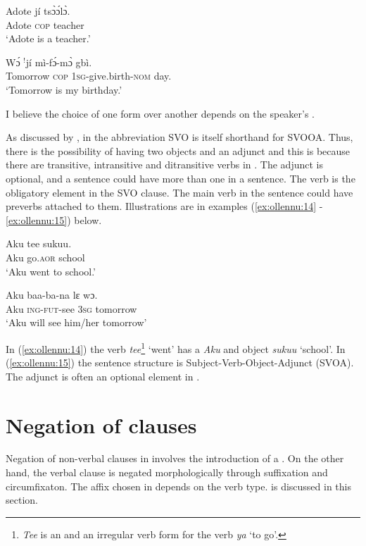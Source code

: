 \documentclass[output=paper,newtxmath,modfonts,nonflat,draftmode]{langsci/langscibook}
\begin{document}
\ea \label{ex:ollennu:12}
\gll Adote jí ts\`ɔ\'ɔl\`ɔ.\\
Adote \textsc{cop} teacher\\
\glt`Adote is a teacher.'
\z

\ea \label{ex:ollennu:13}
\gll W\'ɔ $^{!}$jí mì-f\'ɔ-m\`ɔ gbì.\\
Tomorrow \textsc{cop} 1\textsc{sg}-give.birth-\textsc{nom} day.\\
\glt `Tomorrow is my birthday.'
\z


I believe the choice of one form over another depends on the speaker’s .

As discussed by \citet{Dakubu2003}, in  the abbreviation SVO is itself shorthand for SVOOA. Thus, there is the possibility of having two objects and an adjunct and this is because there are transitive, intransitive and ditransitive verbs in . The adjunct is optional, and a sentence could have more than one in a sentence. The verb is the obligatory element in the SVO clause. The main verb in the sentence could have preverbs attached to them. Illustrations are in examples (\ref{ex:ollennu:14} -\ref{ex:ollennu:15}) below.

\ea \label{ex:ollennu:14}
\gll Aku tee sukuu.\\
Aku go.\textsc{aor} school\\
\glt `Aku went to school.'
\z

\ea \label{ex:ollennu:15}
 \gll Aku baa-ba-na lɛ wɔ.\\
Aku \textsc{ing}-\textsc{fut}-see 3\textsc{sg} tomorrow\\
\glt`Aku will see him/her tomorrow'
\z


In (\ref{ex:ollennu:14}) the verb \textit{tee}\footnote{\textit{Tee} is an  and an irregular verb form for the verb \textit{ya} `to go'.} `went' has a  \textit{Aku} and object \textit{sukuu} `school'. In (\ref{ex:ollennu:15}) the sentence structure is Subject-Verb-Object-Adjunct (SVOA). The adjunct is often an optional element in .

\section{\label{sec:ollennu:2} Negation of clauses}


Negation of non-verbal clauses in  involves the introduction of a . On the other hand, the verbal clause is negated morphologically through suffixation and circumfixaton. The affix chosen in  depends on the verb type.   is discussed in this section.
\end{document}

